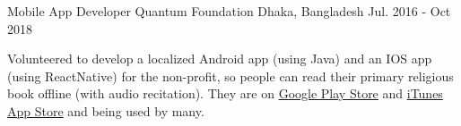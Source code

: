 

\begin{cventries}

  \cventry
    {Mobile App Developer} %
    {Quantum Foundation} %
    {Dhaka, Bangladesh} %
    {Jul. 2016 - Oct 2018} %
    {
      \begin{cvitems} %
        \item {Volunteered to develop a localized Android app (using Java) and an IOS app (using ReactNative) for the non-profit, so people can read their primary religious book offline (with audio recitation). They are on \href{https://play.google.com/store/apps/details?id=quantum.org.quran}{\color{blue}Google Play Store} and \href{https://itunes.apple.com/us/app/al-quran-bangla-mormobani/id1229434136?mt=8}{\color{blue}iTunes App Store} and being used by many.}
      \end{cvitems}
    }
\end{cventries}
